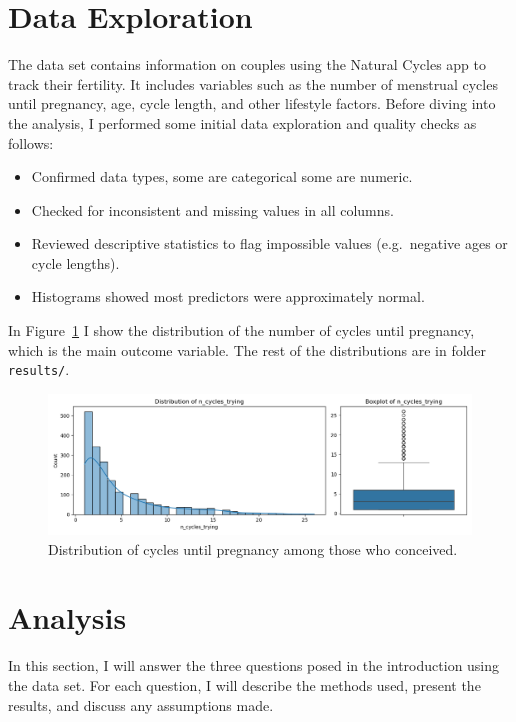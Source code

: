 \documentclass[11pt,a4paper]{article}
\begin{document}
\section{Data Exploration}
The data set contains information on couples using the Natural Cycles app to track their fertility. It includes variables such as the number of menstrual cycles until pregnancy, age, cycle length, and other lifestyle factors. Before diving into the analysis, I performed some initial data exploration and quality checks as follows:
\begin{itemize}
  \item Confirmed data types, some are categorical some are numeric.
    \item Checked for inconsistent and missing values in all columns.
  \item Reviewed descriptive statistics to flag impossible values (e.g.\ negative ages or cycle lengths).
  \item Histograms showed most predictors were approximately normal.
\end{itemize}
In Figure~\ref{fig:histogram} I show the distribution of the number of cycles until pregnancy, which is the main outcome variable. The rest of the distributions are in folder \texttt{results/}.
\begin{figure}[htbp]
  \centering
  \includegraphics[width=0.7\linewidth]{../results/distribution_n_cycles_trying.png}
  \caption{Distribution of cycles until pregnancy among those who conceived.}
  \label{fig:histogram}
\end{figure}

\FloatBarrier

\section{Analysis}
In this section, I will answer the three questions posed in the introduction using the data set. For each question, I will describe the methods used, present the results, and discuss any assumptions made.
\end{document}
